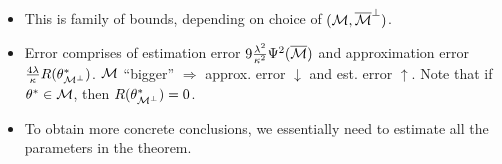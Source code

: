 \begin{rmk}\leavevmode
\begin{itemize}
    \item This is family of bounds, depending on choice of $(\mathcal{M}, {\overline{\mathcal{M}}}^\perp)$.
    \item Error comprises of estimation error $9\frac{\lambda^2}{\kappa^2}\Psi^2({\overline{\mathcal{M}}})$ and
        approximation error $\frac{4\lambda}{\kappa}R(\theta^*_{\mathcal{M}^\perp})$.
        $\mathcal{M}$ ``bigger'' $\Rightarrow$ approx. error $\downarrow$ and est. error $\uparrow$.
        Note that if $\theta^*\in\mathcal{M}$, then $R(\theta^*_{\mathcal{M}^\perp})=0$.
    \item To obtain more concrete conclusions, we essentially need to estimate
        all the parameters in the theorem.
\end{itemize}
\end{rmk}

